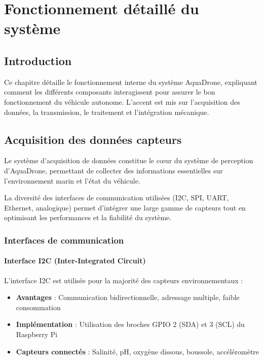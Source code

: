 \chapter[Fonctionnement détaillé du système]{Fonctionnement détaillé du système}
\label{cp:fonctionnement-detaille}

{
\parindent0pt

\section{Introduction}
Ce chapitre détaille le fonctionnement interne du système AquaDrone, expliquant comment les différents composants interagissent pour assurer le bon fonctionnement du véhicule autonome. L'accent est mis sur l'acquisition des données, la transmission, le traitement et l'intégration mécanique.

\section{Acquisition des données capteurs}
Le système d'acquisition de données constitue le cœur du système de perception d'AquaDrone, permettant de collecter des informations essentielles sur l'environnement marin et l'état du véhicule.

\begin{block}[note]
La diversité des interfaces de communication utilisées (I2C, SPI, UART, Ethernet, analogique) permet d'intégrer une large gamme de capteurs tout en optimisant les performances et la fiabilité du système.
\end{block}

\subsection{Interfaces de communication}
\subsubsection{Interface I2C (Inter-Integrated Circuit)}
L'interface I2C est utilisée pour la majorité des capteurs environnementaux :
\begin{itemize}
    \setlength{\itemsep}{.375em}
    \item \textbf{Avantages} : Communication bidirectionnelle, adressage multiple, faible consommation
    \item \textbf{Implémentation} : Utilisation des broches GPIO 2 (SDA) et 3 (SCL) du Raspberry Pi
    \item \textbf{Capteurs connectés} : Salinité, pH, oxygène dissous, boussole, accéléromètre
\end{itemize}

}
